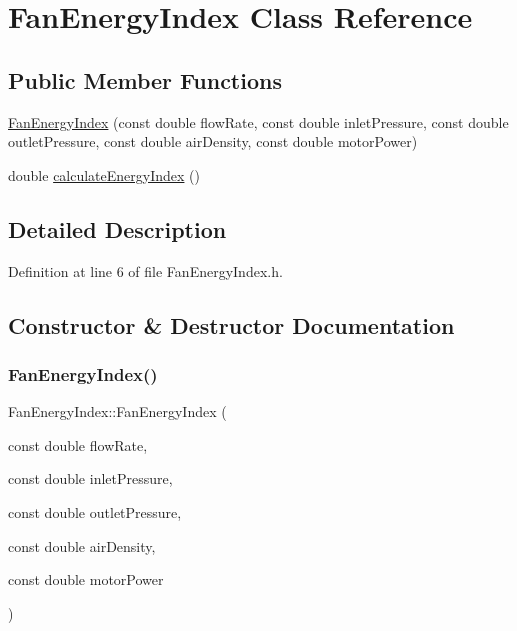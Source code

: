 \hypertarget{class_fan_energy_index}{}\section{Fan\+Energy\+Index Class Reference}
\label{class_fan_energy_index}
\subsection*{Public Member Functions}
\begin{DoxyCompactItemize}
\item 
\hyperlink{class_fan_energy_index_aea662b131f62c3b78196aabb0046c9a9}{Fan\+Energy\+Index} (const double flow\+Rate, const double inlet\+Pressure, const double outlet\+Pressure, const double air\+Density, const double motor\+Power)
\item 
double \hyperlink{class_fan_energy_index_ab1bf0268caaed615a5f00027b3801198}{calculate\+Energy\+Index} ()
\end{DoxyCompactItemize}


\subsection{Detailed Description}


Definition at line 6 of file Fan\+Energy\+Index.\+h.



\subsection{Constructor \& Destructor Documentation}
\mbox{\label{class_fan_energy_index_aea662b131f62c3b78196aabb0046c9a9}} 
\subsubsection{\texorpdfstring{Fan\+Energy\+Index()}{FanEnergyIndex()}}
{\footnotesize\ttfamily Fan\+Energy\+Index\+::\+Fan\+Energy\+Index (\begin{DoxyParamCaption}\item[{const double}]{flow\+Rate,  }\item[{const double}]{inlet\+Pressure,  }\item[{const double}]{outlet\+Pressure,  }\item[{const double}]{air\+Density,  }\item[{const double}]{motor\+Power }\end{DoxyParamCaption})\hspace{0.3cm}{\ttfamily [inline]}}


